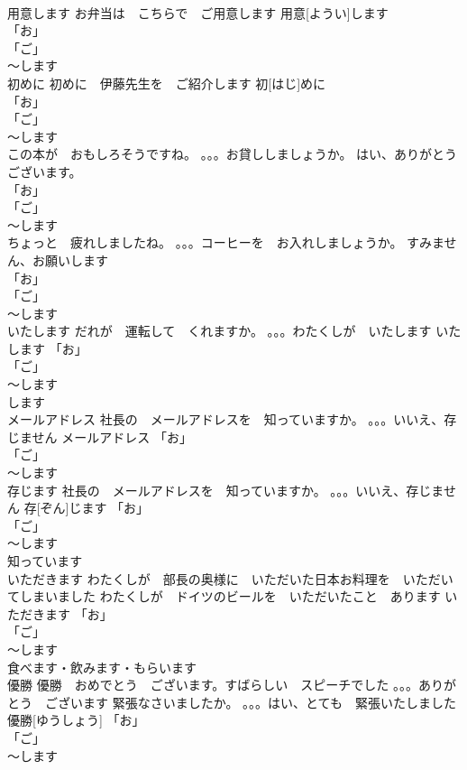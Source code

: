 \documentclass[8pt]{extreport}
\begin{document}
\begin{CJK}{UTF8}{min}
\\	用意します	お弁当は　こちらで　ご用意します	用意[ようい]します			
\\	「お」
\\	「ご」
\\	～します 
\\	初めに	初めに　伊藤先生を　ご紹介します	初[はじ]めに			
\\	「お」
\\	「ご」
\\	～します 
\\	この本が　おもしろそうですね。 。。。お貸ししましょうか。 はい、ありがとうございます。	
\\	「お」
\\	「ご」
\\	～します 
\\	ちょっと　疲れしましたね。 。。。コーヒーを　お入れしましょうか。 すみません、お願いします	
\\	「お」
\\	「ご」
\\	～します 
\\	いたします	だれが　運転して　くれますか。 。。。わたくしが　いたします	いたします				「お」
\\	「ご」
\\	～します 
\\	します
\\	メールアドレス	社長の　メールアドレスを　知っていますか。 。。。いいえ、存じません	メールアドレス				「お」
\\	「ご」
\\	～します 
\\	存じます	社長の　メールアドレスを　知っていますか。 。。。いいえ、存じません	存[ぞん]じます				「お」
\\	「ご」
\\	～します 
\\	知っています
\\	いただきます	わたくしが　部長の奥様に　いただいた日本お料理を　いただいてしまいました わたくしが　ドイツのビールを　いただいたこと　あります	いただきます				「お」
\\	「ご」
\\	～します 
\\	食べます・飲みます・もらいます
\\	優勝	優勝　おめでとう　ございます。すばらしい　スピーチでした 。。。ありがとう　ございます 緊張なさいましたか。 。。。はい、とても　緊張いたしました	優勝[ゆうしょう]				「お」
\\	「ご」
\\	～します 

\end{CJK}
\end{document}

